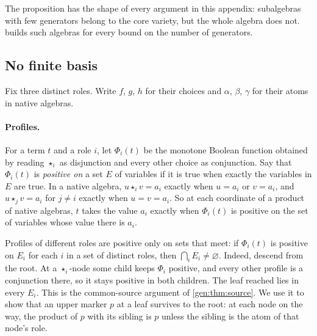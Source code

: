 The proposition has the shape of every argument in this appendix:
subalgebras with few generators belong to the core variety, but the whole
algebra does not.  builds such algebras for every bound
on the number of generators.

\subsection{No finite basis}\label{app:core-nfb}

Fix three distinct roles. Write $f$, $g$, $h$ for their choices and
$\alpha$, $\beta$, $\gamma$ for their atoms in native algebras.

\paragraph{Profiles.}
For a term $t$ and a role $i$, let $\Phi_i(t)$ be the monotone Boolean
function obtained by reading $\star_i$ as disjunction and every other choice
as conjunction. Say that $\Phi_i(t)$ is \emph{positive on} a set $E$ of
variables if it is true when exactly the variables in $E$ are true. In a
native algebra, $u\star_i v=a_i$ exactly when $u=a_i$ or $v=a_i$, and
$u\star_j v=a_i$ for $j\ne i$ exactly when $u=v=a_i$. So at each coordinate
of a product of native algebras, $t$ takes the value $a_i$ exactly when
$\Phi_i(t)$ is positive on the set of variables whose value there is $a_i$.

Profiles of different roles are positive only on sets that meet: if
$\Phi_i(t)$ is positive on $E_i$ for each $i$ in a set of distinct roles,
then $\bigcap_iE_i\ne\varnothing$. Indeed, descend from the root. At a
$\star_i$-node some child keeps $\Phi_i$ positive, and every other profile
is a conjunction there, so it stays positive in both children. The leaf
reached lies in every $E_i$. This is the common-source argument of
\cref{gen:thm:source}. We use it to show that an upper marker $p$ at a leaf
survives to the root: at each node on the way, the product of $p$ with its
sibling is $p$ unless the sibling is the atom of that node's role.

